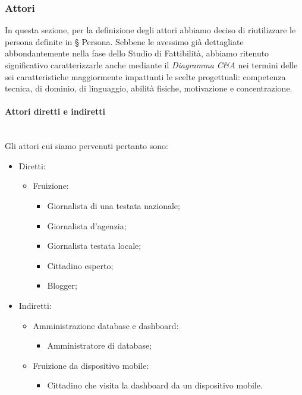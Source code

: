 \subsubsection{Attori}
In questa sezione, per la definizione degli attori abbiamo deciso di riutilizzare le persona definite in § Persona.
Sebbene le avessimo già dettagliate abbondantemente nella fase dello Studio di Fattibilità, abbiamo ritenuto significativo caratterizzarle anche mediante il \textit{Diagramma C\&A} nei termini delle sei caratteristiche maggiormente impattanti le scelte progettuali: competenza tecnica, di dominio, di linguaggio, abilità fisiche, motivazione e concentrazione.

\noindent
\paragraph{Attori diretti e indiretti}\mbox{}\\
Gli attori cui siamo pervenuti pertanto sono:
\begin{itemize}
    \item Diretti:
    \begin{itemize}
        \item Fruizione:
        \begin{itemize}
            \item Giornalista di una testata nazionale;
            \item Giornalista d'agenzia;
            \item Giornalista testata locale;
            \item Cittadino esperto;
            \item Blogger;
        \end{itemize}
    \end{itemize}
    \item Indiretti:
    \begin{itemize}
        \item Amministrazione database e dashboard:
        \begin{itemize}
            \item Amministratore di database;
        \end{itemize}
        \item Fruizione da dispositivo mobile:
        \begin{itemize}
            \item Cittadino che visita la dashboard da un dispositivo mobile.
        \end{itemize}
    \end{itemize}
\end{itemize}

